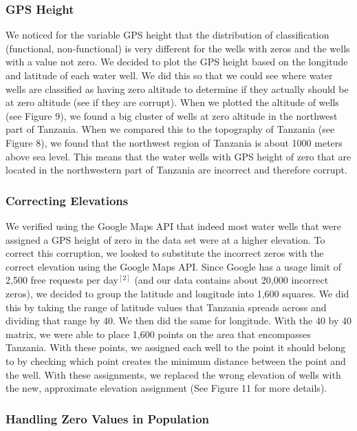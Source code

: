 \documentclass[10pt]{SelfArx} %
\begin{document}
\subsubsection{GPS Height}

We noticed for the variable GPS height that the distribution of classification (functional, non-functional) is very different for the wells with zeros and the wells with a value not zero. We decided to plot the GPS height based on the longitude and latitude of each water well. We did this so that we could see where water wells are classified as having zero altitude to determine if they actually should be at zero altitude (see if they are corrupt). When we plotted the altitude of wells (see Figure 9), we found a big cluster of wells at zero altitude in the northwest part of Tanzania. When we compared this to the topography of Tanzania (see Figure 8), we found that the northwest region of Tanzania is about 1000 meters above sea level. This means that the water wells with GPS height of zero that are located in the northwestern part of Tanzania are incorrect and therefore corrupt. 
\break

\subsubsection{Correcting Elevations}
We verified using the Google Maps API that indeed most water wells that were assigned a GPS height of zero in the data set were at a higher elevation. To correct this corruption, we looked to substitute the incorrect zeros with the correct elevation using the Google Maps API. Since Google has a usage limit of 2,500 free requests per day$^{[2]}$ (and our data contains about 20,000 incorrect zeros), we decided to group the latitude and longitude into 1,600 squares. We did this by taking the range of latitude values that Tanzania spreads across and dividing that range by 40. We then did the same for longitude. With the 40 by 40 matrix, we were able to place 1,600 points on the area that encompasses Tanzania. With these points, we assigned each well to the point it should belong to by checking which point creates the minimum distance between the point and the well. With these assignments, we replaced the wrong elevation of wells with the new, approximate elevation assignment (See Figure 11 for more details).
\break


\subsubsection{Handling Zero Values in Population}
\end{document}
